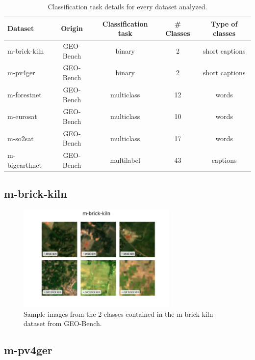 \documentclass[a4paper, oneside, english]{sapthesis}
\begin{document}
\begin{table}[ht]
\centering
\footnotesize
\renewcommand{\arraystretch}{1.2}
    \begin{tabular}{lcccc}
    \toprule
    \textbf{Dataset} & \textbf{Origin} & \textbf{Classification task} & \textbf{\# Classes} & \textbf{Type of classes}  \\
    \midrule
    m-brick-kiln & GEO-Bench & binary & 2 & short captions \\
    m-pv4ger & GEO-Bench & binary & 2 & short captions \\
    m-forestnet & GEO-Bench & multiclass & 12 & words \\
    m-eurosat & GEO-Bench & multiclass & 10 & words \\
    m-so2sat & GEO-Bench & multiclass & 17 & words \\
    m-bigearthnet & GEO-Bench & multilabel & 43 & captions \\
    \bottomrule
    \end{tabular}
\vspace{0.3cm}
\caption{\normalsize Classification task details for every dataset analyzed.}
\label{tab:classtypes}
\end{table}


\subsection{m-brick-kiln}


\begin{figure}[h]
    \centering
    \includegraphics[width=0.7\textwidth]{img/m-brick-kiln_image_grid.png}
    \caption{Sample images from the 2 classes contained in the m-brick-kiln dataset from GEO-Bench.}
    \label{fig:brickgrid}
\end{figure}


\subsection{m-pv4ger}
\end{document}
